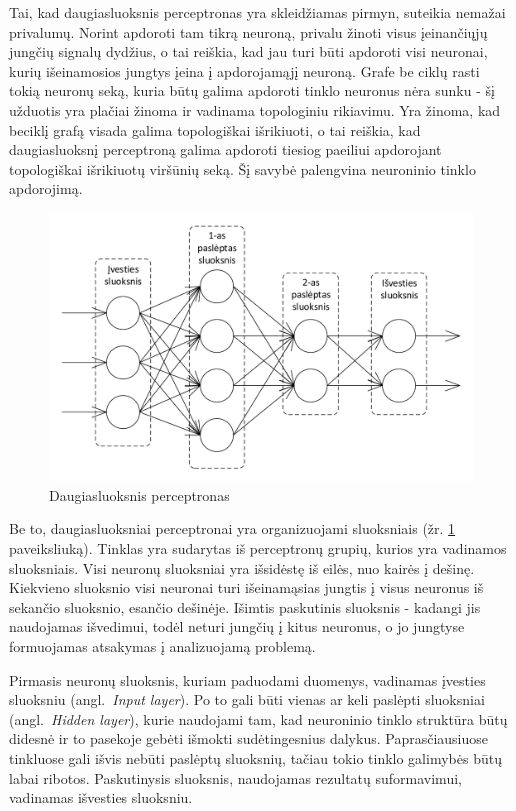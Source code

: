 \documentclass{VUMIFPSbakalaurinis}
\begin{document}
Tai, kad daugiasluoksnis perceptronas yra skleidžiamas pirmyn, suteikia nemažai privalumų.
Norint apdoroti tam tikrą neuroną, privalu žinoti visus įeinančiųjų jungčių signalų dydžius, o tai reiškia, kad jau turi būti apdoroti visi neuronai, kurių išeinamosios jungtys įeina į apdorojamąjį neuroną.
Grafe be ciklų rasti tokią neuronų seką, kuria būtų galima apdoroti tinklo neuronus nėra sunku - šį užduotis yra plačiai žinoma ir vadinama topologiniu rikiavimu.
Yra žinoma, kad beciklį grafą visada galima topologiškai išrikiuoti, o tai reiškia, kad daugiasluoksnį perceptroną galima apdoroti tiesiog paeiliui apdorojant topologiškai išrikiuotų viršūnių seką.
Šį savybė palengvina neuroninio tinklo apdorojimą.


\begin{figure}
	\includegraphics[scale=0.75]{diagrams/2_neural_network}
	\caption{Daugiasluoksnis perceptronas}
	\label{fig:neural_network}
\end{figure}

Be to, daugiasluoksniai perceptronai yra organizuojami sluoksniais (žr. \ref{fig:neural_network} paveiksliuką).
Tinklas yra sudarytas iš perceptronų grupių, kurios yra vadinamos sluoksniais.
Visi neuronų sluoksniai yra išsidėstę iš eilės, nuo kairės į dešinę.
Kiekvieno sluoksnio visi neuronai turi išeinamąsias jungtis į visus neuronus iš sekančio sluoksnio, esančio dešinėje.
Išimtis paskutinis sluoksnis - kadangi jis naudojamas išvedimui, todėl neturi jungčių į kitus neuronus, o jo jungtyse formuojamas atsakymas į analizuojamą problemą.

Pirmasis neuronų sluoksnis, kuriam paduodami duomenys, vadinamas įvesties sluoksniu (angl.~\textit{Input layer}).
Po to gali būti vienas ar keli paslėpti sluoksniai (angl.~\textit{Hidden layer}), kurie naudojami tam, kad neuroninio tinklo struktūra būtų didesnė ir to pasekoje gebėti išmokti sudėtingesnius dalykus.
Paprasčiausiuose tinkluose gali išvis nebūti paslėptų sluoksnių, tačiau tokio tinklo galimybės būtų labai ribotos.
Paskutinysis sluoksnis, naudojamas rezultatų suformavimui, vadinamas išvesties sluoksniu.
\end{document}
